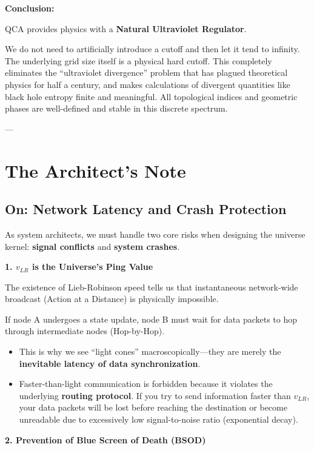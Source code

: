 \documentclass[11pt,a4paper,twoside]{book}
\begin{document}
\textbf{Conclusion:}

QCA provides physics with a \textbf{Natural Ultraviolet Regulator}.

We do not need to artificially introduce a cutoff and then let it tend to infinity. The underlying grid size itself is a physical hard cutoff. This completely eliminates the ``ultraviolet divergence'' problem that has plagued theoretical physics for half a century, and makes calculations of divergent quantities like black hole entropy finite and meaningful. All topological indices and geometric phases are well-defined and stable in this discrete spectrum.

---

\section{The Architect's Note}

\subsection{On: Network Latency and Crash Protection}

As system architects, we must handle two core risks when designing the universe kernel: \textbf{signal conflicts} and \textbf{system crashes}.

\textbf{1. $v_{LR}$ is the Universe's Ping Value}

The existence of Lieb-Robinson speed tells us that instantaneous network-wide broadcast (Action at a Distance) is physically impossible.

If node A undergoes a state update, node B must wait for data packets to hop through intermediate nodes (Hop-by-Hop).

\begin{itemize}
\item This is why we see ``light cones'' macroscopically---they are merely the \textbf{inevitable latency of data synchronization}.

\item Faster-than-light communication is forbidden because it violates the underlying \textbf{routing protocol}. If you try to send information faster than \textbf{$v_{LR}$}, your data packets will be lost before reaching the destination or become unreadable due to excessively low signal-to-noise ratio (exponential decay).
\end{itemize}

\textbf{2. Prevention of Blue Screen of Death (BSOD)}
\end{document}
